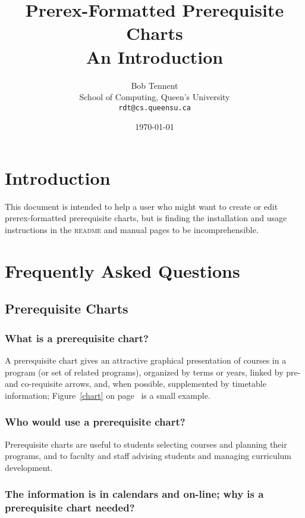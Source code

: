\documentclass[11pt]{article}
\title{Prerex-Formatted Prerequisite Charts\\[1ex]\Large An Introduction}
\date{\today}
\author{Bob Tennent\\School of Computing, Queen's University\\\texttt{rdt@cs.queensu.ca}}
\begin{document}
\sloppy
\maketitle
\thispagestyle{empty}

\tableofcontents


\section{Introduction}
This document is intended to help a user who might want to create or edit prerex-formatted
prerequisite charts, but is finding the installation and usage instructions in the \textsc{readme}
and manual pages to be incomprehensible.

\section{Frequently Asked Questions}


\subsection{Prerequisite Charts}

\subsubsection*{What is a prerequisite chart?}

A prerequisite chart gives an attractive graphical presentation of courses in a
program (or set of related programs), organized by terms or years, linked
by pre- and co-requisite arrows, and, when possible, supplemented by
timetable information; Figure~\ref{chart}
on page~\pageref{chart}
is a small example.



\subsubsection*{Who would use a prerequisite chart?}

Prerequisite charts are useful to students selecting courses and planning their
programs, and to faculty and staff advising students and managing
curriculum development.

\subsubsection*{The information is in calendars and on-line; why is a prerequisite chart needed?}
\end{document}
